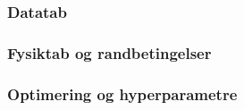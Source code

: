 \subsubsection{Datatab}
\subsubsection{Fysiktab og randbetingelser}
\subsubsection{Optimering og hyperparametre}
